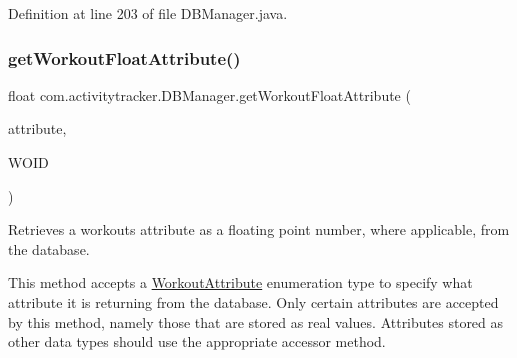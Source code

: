 Definition at line 203 of file D\+B\+Manager.\+java.

\mbox{\label{classcom_1_1activitytracker_1_1_d_b_manager_a6bda377e79678d0e898c4240d24eb391}} 
\subsubsection{\texorpdfstring{get\+Workout\+Float\+Attribute()}{getWorkoutFloatAttribute()}}
{\footnotesize\ttfamily float com.\+activitytracker.\+D\+B\+Manager.\+get\+Workout\+Float\+Attribute (\begin{DoxyParamCaption}\item[{final \mbox{\hyperlink{enumcom_1_1activitytracker_1_1_workout_attribute}{Workout\+Attribute}}}]{attribute,  }\item[{final int}]{W\+O\+ID }\end{DoxyParamCaption})}

Retrieves a workout\textquotesingle{}s attribute as a floating point number, where applicable, from the database.

This method accepts a \mbox{\hyperlink{enumcom_1_1activitytracker_1_1_workout_attribute}{Workout\+Attribute}} enumeration type to specify what attribute it is returning from the database. Only certain attributes are accepted by this method, namely those that are stored as real values. Attributes stored as other data types should use the appropriate accessor method.


